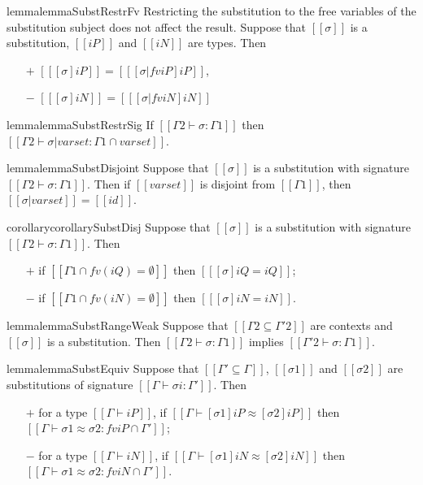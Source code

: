 \begin{restatable}{lemma}{lemmaSubstRestrFv}
    \label{lemma:subst-restr-fv}
    Restricting the substitution to the free variables of the
    substitution subject does not affect the result.
    Suppose that $[[σ]]$ is a substitution,
    $[[iP]]$ and $[[iN]]$ are types. Then
    \begin{itemize}
        \item[$+$] $[[ [σ]iP ]] = [[ [σ|fv iP]iP ]]$,
        \item[$-$] $[[ [σ]iN ]] = [[ [σ|fv iN]iN ]]$
    \end{itemize}
\end{restatable}


\begin{restatable}{lemma}{lemmaSubstRestrSig}
    \label{lemma:subst-restr-sig}
    If $[[Γ2 ⊢ σ : Γ1]]$ then $[[Γ2 ⊢ σ|varset :  Γ1 ∩ varset]]$.
\end{restatable}

\begin{restatable}{lemma}{lemmaSubstDisjoint}
    \label{lemma:subst-disjoint}
    Suppose that $[[σ]]$ is a substitution with signature $[[Γ2 ⊢ σ : Γ1]]$. 
    Then if $[[varset]]$ is disjoint from $[[Γ1]]$, 
    then $[[ σ|varset]] = [[ id ]]$. 
\end{restatable}

\begin{restatable}{corollary}{corollarySubstDisj}
    \label{corollary:subst-disj}
    Suppose that $[[σ]]$ is a substitution with signature $[[Γ2 ⊢ σ : Γ1]]$. Then
    \begin{itemize}
        \item [$+$] if $[[Γ1 ∩ fv(iQ) = ∅]]$ then $[[ [σ] iQ = iQ]]$;
        \item [$-$] if $[[Γ1 ∩ fv(iN) = ∅]]$ then $[[ [σ] iN = iN]]$.
    \end{itemize}
\end{restatable}

\begin{restatable}{lemma}{lemmaSubstRangeWeak}
    \label{lemma:subst-range-weakening}
    Suppose that $[[Γ2 ⊆ Γ'2]]$ are contexts and 
    $[[σ]]$ is a substitution.
    Then $[[Γ2 ⊢ σ : Γ1]]$ implies $[[Γ'2 ⊢ σ : Γ1]]$.
\end{restatable}

\begin{restatable}{lemma}{lemmaSubstEquiv}
    \label{lemma:subst-equiv}
    Suppose that $[[Γ' ⊆ Γ]]$,
    $[[σ1]]$ and $[[σ2]]$ are substitutions of signature $[[Γ ⊢ σi : Γ']]$.
    Then 
    \begin{enumerate}
        \item [$+$] for a type $[[Γ ⊢ iP]]$, if $[[Γ ⊢ [σ1]iP ≈ [σ2]iP]]$ then 
        $[[Γ ⊢ σ1 ≈ σ2 : fv iP ∩ Γ']]$;
        \item [$-$] for a type $[[Γ ⊢ iN]]$, if $[[Γ ⊢ [σ1]iN ≈ [σ2]iN]]$ then
        $[[Γ ⊢ σ1 ≈ σ2 : fv iN ∩ Γ']]$.
    \end{enumerate}
\end{restatable}

